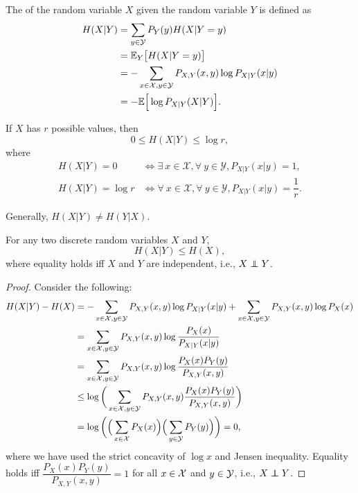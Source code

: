 \documentclass[11pt,a4paper]{article}
\begin{document}
\begin{definition}
    The  of the random variable $X$ given the random variable $Y$ is defined as 
    \begin{align*}
        H(X|Y) &= \sum_{y\in \mathcal{Y}} P_{Y}(y) H(X|Y = y)\\
        &= \mathbb{E}_Y\big[H(X|Y = y)\big] \\
        &= -\sum_{x\in \mathcal{X},y\in \mathcal{Y}} P_{X,Y}(x,y) \log P_{X|Y}(x|y)\\
        &= -\mathbb{E}\Big[\log P_{X|Y}(X|Y) \Big].
    \end{align*}
\end{definition}

\begin{corollary}
    If $X$ has $r$ possible values, then 
    \begin{equation*}
        0 \le H(X|Y)\le \log r,
    \end{equation*}
    where 
    \begin{align*}
        H(X|Y) = 0\quad &\iff \exists\ x\in\mathcal{X}, \forall\ y\in \mathcal{Y}, P_{X|Y}(x|y) = 1, \\
        H(X|Y) = \log r &\iff \forall\ x\in\mathcal{X}, \forall\ y\in \mathcal{Y}, P_{X|Y}(x|y) = \dfrac{1}{r}.
    \end{align*}
\end{corollary}

\begin{remark}
    Generally, $H(X|Y)\neq H(Y|X)$.
\end{remark}

\begin{theorem}\label{thm:conditioning_reduces_entropy}
    For any two discrete random variables $X$ and $Y$,
    \begin{equation*}
        H(X|Y)\le H(X),
    \end{equation*}
    where equality holds iff $X$ and $Y$ are independent, i.e., $X \perp\!\!\!\!\perp Y$.
\end{theorem}

\begin{proof}
    Consider the following:
    \begin{align*}
        H(X|Y) - H(X) &= -\sum_{x\in \mathcal{X}, y\in \mathcal{Y}} P_{X,Y}(x,y) \log P_{X|Y}(x|y) + \sum_{x\in \mathcal{X}, y\in \mathcal{Y}} P_{X,Y}(x,y) \log P_{X}(x) \\
        &= \sum_{x\in \mathcal{X}, y\in \mathcal{Y}} P_{X,Y}(x,y) \log \dfrac{P_{X}(x)}{P_{X|Y}(x|y)} \\
        &= \sum_{x\in \mathcal{X}, y\in \mathcal{Y}} P_{X,Y}(x,y) \log \dfrac{P_{X}(x)P_{Y}(y)}{P_{X,Y}(x,y)} \\
        &\le \log \bigg( \sum_{x\in \mathcal{X}, y\in \mathcal{Y}} P_{X,Y}(x,y) \dfrac{P_{X}(x)P_{Y}(y)}{P_{X,Y}(x,y)}\bigg) \\
        &= \log \bigg(\Big(\sum_{x\in \mathcal{X}} P_{X}(x)\Big) \Big(\sum_{y\in \mathcal{Y}}P_{Y}(y)\Big)\bigg) = 0,
    \end{align*}
    where we have used the strict concavity of $\log x$ and Jensen inequality. Equality holds iff $\dfrac{P_{X}(x)P_{Y}(y)}{P_{X,Y}(x,y)} = 1$ for all $x\in \mathcal{X}$ and $y\in \mathcal{Y}$, i.e., $X\perp\!\!\!\!\perp Y$.
\end{proof}
\end{document}
